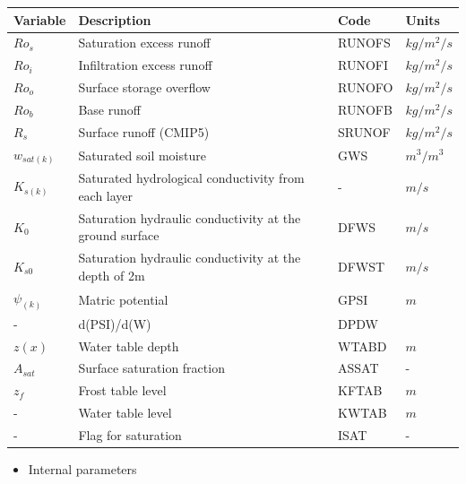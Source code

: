 \begin{longtable}[]{@{}llll@{}}
\toprule
Variable & Description & Code & Units \\
\midrule
\endhead
\(Ro_s\) & Saturation excess runoff & RUNOFS & \(kg/m^2/s\) \\
\(Ro_i\) & Infiltration excess runoff & RUNOFI & \(kg/m^2/s\) \\
\(Ro_o\) & Surface storage overflow & RUNOFO & \(kg/m^2/s\) \\
\(Ro_b\) & Base runoff & RUNOFB & \(kg/m^2/s\) \\
\(R_s\) & Surface runoff (CMIP5) & SRUNOF & \(kg/m^2/s\) \\
\(w_{sat(k)}\) & Saturated soil moisture & GWS & \(m^3/m^3\) \\
\(K_{s(k)}\) & Saturated hydrological conductivity from each layer & - & \(m/s\) \\
\(K_0\) & Saturation hydraulic conductivity at the ground surface & DFWS & \(m/s\) \\
\(K_{s0}\) & Saturation hydraulic conductivity at the depth of 2m & DFWST & \(m/s\) \\
\(\psi_{(k)}\) & Matric potential & GPSI & \(m\) \\
- & d(PSI)/d(W) & DPDW & \\
\(z(x)\) & Water table depth & WTABD & \(m\) \\
\(A_{sat}\) & Surface saturation fraction & ASSAT & - \\
\(z_f\) & Frost table level & KFTAB & \(m\) \\
- & Water table level & KWTAB & \(m\) \\
- & Flag for saturation & ISAT & - \\
\bottomrule
\end{longtable}

\begin{itemize}
\tightlist
\item
  Internal parameters
\end{itemize}

